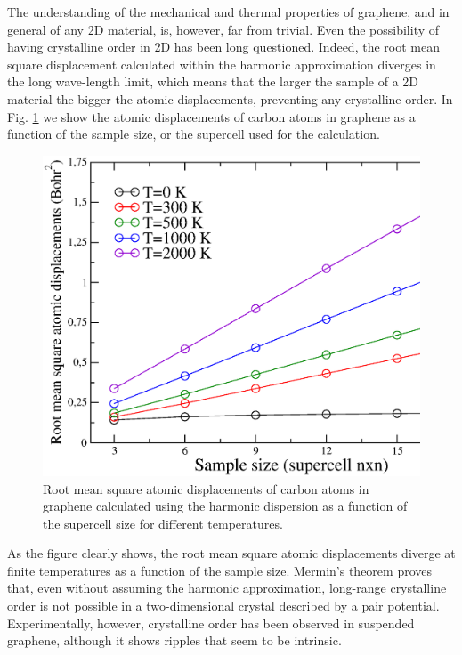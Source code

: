 The understanding of the mechanical and thermal properties of graphene, and in general of any 2D material, 
is, however, far from trivial. Even the possibility of having crystalline order in 2D has been long 
questioned\cite{landau_statistical_physics,mermin1968crystalline}. Indeed, the root mean square displacement 
calculated within the harmonic approximation diverges in the long wave-length limit, which means that the larger the 
sample of a 2D material the bigger the atomic displacements, preventing any crystalline 
order\cite{landau_statistical_physics}. In Fig. \ref{rms_harmonic} we show the atomic displacements of carbon atoms 
in graphene as a function of the sample size, or the supercell used for the calculation.
\begin{figure}[h]
\includegraphics[width=0.8\linewidth]{Figures/rms-harmonic.eps}
\caption[Root mean square atomic displacements of carbon atoms in graphene calculated using the harmonic 
	dispersion]{Root mean square atomic displacements of carbon atoms in graphene calculated using the harmonic 
	dispersion as a function of the supercell size for different temperatures.}
\label{rms_harmonic}
\end{figure}
As the figure clearly shows, the root mean square atomic displacements diverge at finite temperatures as a function 
of the sample size. Mermin's theorem\cite{mermin1968crystalline} proves that, even without assuming the harmonic 
approximation, long-range crystalline order is not possible in a two-dimensional crystal described by a pair 
potential. Experimentally, however, crystalline order has been observed in suspended 
graphene\cite{meyer2007structure}, although it shows ripples that seem to be intrinsic\cite{fasolino2007intrinsic}. \\

